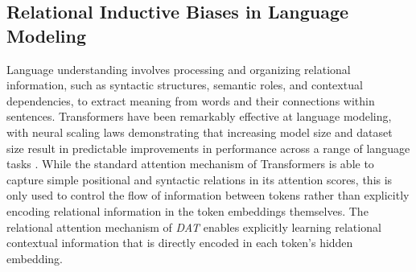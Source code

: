 

\subsection{Relational Inductive Biases in Language Modeling}\label{ssec:fineweb}

Language understanding involves processing and organizing relational information, such as syntactic structures, semantic roles, and contextual dependencies, to extract meaning from words and their connections within sentences. Transformers have been remarkably effective at language modeling, with neural scaling laws demonstrating that increasing model size and dataset size result in predictable improvements in performance across a range of language tasks \citep{kaplan2020scalinglawsneurallanguage}. While the standard attention mechanism of Transformers is able to capture simple positional and syntactic relations in its attention scores, this is only used to control the flow of information between tokens rather than explicitly encoding relational information in the token embeddings themselves. The relational attention mechanism of \textit{DAT} enables explicitly learning relational contextual information that is directly encoded in each token's hidden embedding.

